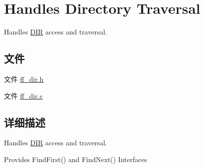 \hypertarget{group___d_i_r}{}\section{Handles Directory Traversal}
\label{group___d_i_r}


Handles \hyperlink{struct_d_i_r}{D\+IR} access and traversal.  


\subsection*{文件}
\begin{DoxyCompactItemize}
\item 
文件 \hyperlink{ff__dir_8h}{ff\+\_\+dir.\+h}
\item 
文件 \hyperlink{ff__dir_8c}{ff\+\_\+dir.\+c}
\end{DoxyCompactItemize}


\subsection{详细描述}
Handles \hyperlink{struct_d_i_r}{D\+IR} access and traversal. 

Provides Find\+First() and Find\+Next() Interfaces 